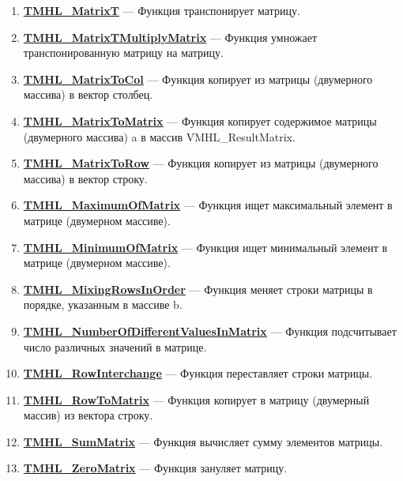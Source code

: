 \documentclass[a4paper,12pt]{article}
\begin{document}
\begin{enumerate}
\item \textbf{\hyperref[TMHL_MatrixT]{TMHL\_MatrixT}} --- Функция транспонирует матрицу.

\item \textbf{\hyperref[TMHL_MatrixTMultiplyMatrix]{TMHL\_MatrixTMultiplyMatrix}} --- Функция умножает транспонированную матрицу на матрицу.

\item \textbf{\hyperref[TMHL_MatrixToCol]{TMHL\_MatrixToCol}} --- Функция копирует из матрицы (двумерного массива) в вектор столбец.

\item \textbf{\hyperref[TMHL_MatrixToMatrix]{TMHL\_MatrixToMatrix}} --- Функция копирует содержимое матрицы (двумерного массива) a в массив VMHL\_ResultMatrix.

\item \textbf{\hyperref[TMHL_MatrixToRow]{TMHL\_MatrixToRow}} --- Функция копирует из матрицы (двумерного массива) в вектор строку.

\item \textbf{\hyperref[TMHL_MaximumOfMatrix]{TMHL\_MaximumOfMatrix}} --- Функция ищет максимальный элемент в матрице (двумерном массиве).

\item \textbf{\hyperref[TMHL_MinimumOfMatrix]{TMHL\_MinimumOfMatrix}} --- Функция ищет минимальный элемент в матрице (двумерном массиве).

\item \textbf{\hyperref[TMHL_MixingRowsInOrder]{TMHL\_MixingRowsInOrder}} --- Функция меняет строки матрицы в порядке, указанным в массиве b.

\item \textbf{\hyperref[TMHL_NumberOfDifferentValuesInMatrix]{TMHL\_NumberOfDifferentValuesInMatrix}} --- Функция подсчитывает число различных значений в матрице.

\item \textbf{\hyperref[TMHL_RowInterchange]{TMHL\_RowInterchange}} --- Функция переставляет строки матрицы.

\item \textbf{\hyperref[TMHL_RowToMatrix]{TMHL\_RowToMatrix}} --- Функция копирует в матрицу (двумерный массив) из вектора строку.

\item \textbf{\hyperref[TMHL_SumMatrix]{TMHL\_SumMatrix}} --- Функция вычисляет сумму элементов матрицы.

\item \textbf{\hyperref[TMHL_ZeroMatrix]{TMHL\_ZeroMatrix}} --- Функция зануляет матрицу.

\end{enumerate}
\end{document}
